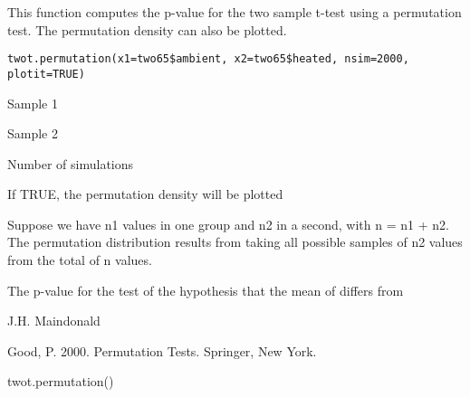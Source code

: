 \begin{Description}\relax
This function computes the p-value for the two sample
t-test using a permutation test.  The permutation density
can  also be plotted.
\end{Description}
\begin{Usage}
\begin{verbatim}
twot.permutation(x1=two65$ambient, x2=two65$heated, nsim=2000, plotit=TRUE)
\end{verbatim}
\end{Usage}
\begin{Arguments}
\begin{ldescription}
\item[\code{x1}] Sample 1
\item[\code{x2}] Sample 2
\item[\code{nsim}] Number of simulations
\item[\code{plotit}] If TRUE, the permutation density will be plotted
\end{ldescription}
\end{Arguments}
\begin{Details}\relax
Suppose we have n1 values in one group and n2 in a
second, with n = n1 + n2. The permutation distribution
results from taking all possible samples of n2 values from
the total of n values.
\end{Details}
\begin{Value}
The p-value for the test of the hypothesis that the mean of
 differs from 
\end{Value}
\begin{Author}\relax
J.H. Maindonald
\end{Author}
\begin{References}\relax
Good, P. 2000. Permutation Tests. Springer, New York.
\end{References}
\begin{Examples}
\begin{ExampleCode}
twot.permutation()
\end{ExampleCode}
\end{Examples}

